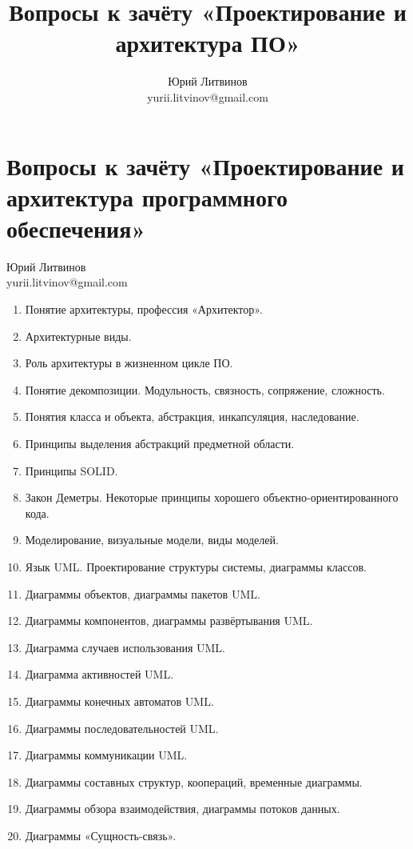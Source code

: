 \documentclass[a5paper]{article}
\title{Вопросы к зачёту «Проектирование и архитектура ПО»}
\author{Юрий Литвинов\\\small{yurii.litvinov@gmail.com}}
\begin{document}
\thispagestyle{empty}

\section*{Вопросы к зачёту «Проектирование и архитектура программного обеспечения»}

\begin{flushright}\begin{small}Юрий Литвинов\\\small{yurii.litvinov@gmail.com}\end{small}\end{flushright}

\begin{enumerate}
    \item Понятие архитектуры, профессия «Архитектор».
    \item Архитектурные виды.
    \item Роль архитектуры в жизненном цикле ПО.
    \item Понятие декомпозиции. Модульность, связность, сопряжение, сложность.
    \item Понятия класса и объекта, абстракция, инкапсуляция, наследование.
    \item Принципы выделения абстракций предметной области.
    \item Принципы SOLID.
    \item Закон Деметры. Некоторые принципы хорошего объектно-ориентированного кода.
    \item Моделирование, визуальные модели, виды моделей.
    \item Язык UML. Проектирование структуры системы, диаграммы классов.
    \item Диаграммы объектов, диаграммы пакетов UML.
    \item Диаграммы компонентов, диаграммы развёртывания UML.
    \item Диаграмма случаев использования UML.
    \item Диаграмма активностей UML.
    \item Диаграммы конечных автоматов UML.
    \item Диаграммы последовательностей UML.
    \item Диаграммы коммуникации UML.
    \item Диаграммы составных структур, коопераций, временные диаграммы.
    \item Диаграммы обзора взаимодействия, диаграммы потоков данных.
    \item Диаграммы «Сущность-связь».

\end{enumerate}
\end{document}
